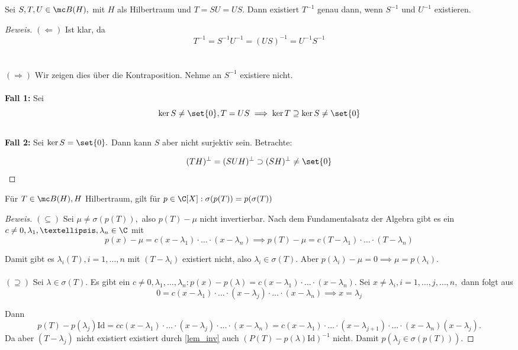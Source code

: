 
\begin{lemma} Sei $S, T, U \in \mc B(H),$ mit $H$ als Hilbertraum und $T = SU = US.$ Dann existiert $T^{-1}$ genau dann, wenn $S^{-1}$ und $U^{-1}$ existieren. 
	
	
	\begin{proof}[Beweis] $(\Leftarrow)$ Ist klar, da \[T^{-1} = S^{-1}U^{-1} = (US)^{-1} = U^{-1}S^{-1}\] \\ \\
		
		$(\Rightarrow)$ Wir zeigen dies über die Kontraposition. Nehme an $S^{-1}$ existiere nicht. \\ \\
		
		\textbf{Fall 1:} Sei \[\ker{S} \not= \set{0}, T = US \implies \ker{T} \supseteq \ker{S} \not= \set{0}\] \\
		
		\textbf{Fall 2:} Sei $\ker{S} = \set{0}.$ Dann kann $S$ aber nicht surjektiv sein. Betrachte:
		
		\[(TH)^{\perp} = (SUH)^{\perp} \supset (SH)^{\perp} \not= \set{0}\] 
		
		
	\end{proof}
	
\end{lemma}


\begin{theorem} \label{lem_inv} Für $T \in \mc B(H), H$ Hilbertraum, gilt für $p \in \C[X]: \sigma(p(T))= p(\sigma(T))$
	
	
	\begin{proof}[Beweis] $(\subseteq)$ Sei $\mu \not= \sigma(p(T)),$ also $p(T)-\mu$ nicht invertierbar. Nach dem Fundamentalsatz der Algebra gibt es ein $c \not= 0, \lambda_1, …, \lambda_n \in \C$ mit \[p(x)- \mu = c(x- \lambda_1)\cdot \dots \cdot (x- \lambda_n) \implies p(T)-\mu = c(T-\lambda_1) \cdot … \cdot (T- \lambda_n)\]
		
		Damit gibt es $\lambda_i (T), i = 1, …, n$ mit $(T- \lambda_i)$ existiert nicht, also $\lambda_i \in \sigma(T).$ Aber $p(\lambda_i)- \mu = 0 \implies \mu = p(\lambda_i).$ \\ \\
		
		$(\supseteq)$ Sei $\lambda \in \sigma(T).$ Es gibt ein $c \not= 0, \lambda_1, …, \lambda_n: p(x)-p(\lambda) = c(x-\lambda_1)\cdot \dots \cdot (x- \lambda_n).$ Sei $x \not= \lambda_i, i = 1, \dots,j, \dots, n,$ dann folgt aus \[0 = c(x- \lambda_1)\cdot \dots \cdot (x- \lambda_j) \cdot \dots \cdot (x- \lambda_n) \implies x= \lambda_j\]
		
		Dann \[p(T)-p(\lambda_j)\text{Id} = cc(x- \lambda_1)\cdot \dots \cdot (x- \lambda_j) \cdot \dots \cdot (x- \lambda_n) = c(x- \lambda_1)\cdot \dots \cdot (x- \lambda_{j+1}) \cdot \dots \cdot (x- \lambda_n) (x- \lambda_j).\] Da aber $(T-\lambda_j)$ nicht existiert existiert durch \ref{lem_inv} auch $(P(T)-p(\lambda)\text{Id})^{-1}$ nicht. Damit $p(\lambda_j \in \sigma(p(T))).$
		
	\end{proof}
	
\end{theorem}


